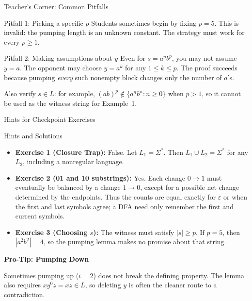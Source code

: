 \documentclass[10pt]{beamer}
\begin{document}
\begin{frame}{Teacher's Corner: Common Pitfalls}
  \small
  \begin{alertblock}{Pitfall 1: Picking a specific $p$}
    Students sometimes begin by fixing $p=5$. This is invalid: the pumping
    length is an unknown constant. The strategy must work for every $p\geq1$.
  \end{alertblock}
  \pause
  \begin{alertblock}{Pitfall 2: Making assumptions about $y$}
    Even for $s=a^{p}b^{p}$, you may not assume $y=a$. The opponent may choose
    $y=a^k$ for any $1\leq k\leq p$. The proof succeeds because pumping
    \emph{every} such nonempty block changes only the number of $a$'s.

    Also verify $s\in L$: for example,
    $(ab)^{p}\notin\{a^{n}b^{n}:n\geq0\}$ when
    $p>1$, so it cannot be used as the witness string for Example~1.
  \end{alertblock}
\end{frame}

\begin{frame}{Hints for Checkpoint Exercises}
  \small
  \begin{block}{Hints and Solutions}
    \begin{itemize}
        \item \textbf{Exercise 1 (Closure Trap):} False. Let
        $L_1=\Sigma^*$. Then $L_1\cup L_2=\Sigma^*$ for any $L_2$, including
        a nonregular language.
        \vspace{0.3cm}
        \item \textbf{Exercise 2 (01 and 10 substrings):} Yes. Each change
        $0\to1$ must eventually be balanced by a change $1\to0$, except for a
        possible net change determined by the endpoints. Thus the counts are
        equal exactly for $\varepsilon$ or when the first and last symbols
        agree; a DFA need only remember the first and current symbols.
        \vspace{0.3cm}
        \item \textbf{Exercise 3 (Choosing $s$):} The witness must satisfy
        $|s|\geq p$. If $p=5$, then $|a^2b^2|=4$, so the pumping lemma makes
        no promise about that string.
    \end{itemize}
  \end{block}
  \pause
  \vspace{0.2cm}
  \textbf{Pro-Tip: Pumping Down}\par
  Sometimes pumping up ($i=2$) does not break the defining property. The
  lemma also requires $xy^0z=xz\in L$, so deleting $y$ is often the cleaner
  route to a contradiction.
\end{frame}
\end{document}
